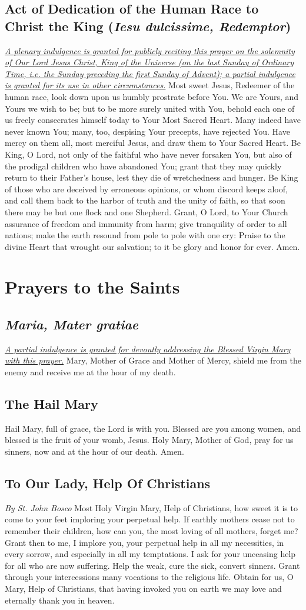 \documentclass[12pt]{article}
\newcommand{\prayersection}[1]{\section{#1}}
\newcommand{\prayertitle}[1]{\subsection{#1}}
\newcommand{\indulgencedprayertitle}[1]{\prayertitle{#1 \protect\kreuz}}
\newcommand{\emphasis}[1]{\emph{#1}}
\newcommand{\emphasis}[1]{\textsl{#1}}
\newcommand{\foreign}[1]{\emphasis{#1}}
\newcommand{\note}[1]{{\small{\emphasis{#1}}}\newline}
\newcommand{\linkednote}[2]{\hyperlink{#1}{\note{#2}}}
\begin{document}
\indulgencedprayertitle{Act of Dedication of the Human Race to Christ the King (\foreign{Iesu dulcissime, Redemptor})}
\linkednote{grant2}{A plenary indulgence is granted for publicly reciting this prayer on the solemnity of Our Lord Jesus Christ, King of the Universe (on the last Sunday of Ordinary Time, i.e. the Sunday preceding the first Sunday of Advent);
a partial indulgence is granted for its use in other circumstances.}
Most sweet Jesus, Redeemer of the human race, look down upon us humbly prostrate before You.
We are Yours, and Yours we wish to be;
but to be more surely united with You, behold each one of us freely consecrates himself today to Your Most Sacred Heart.
Many indeed have never known You;
many, too, despising Your precepts, have rejected You.
Have mercy on them all, most merciful Jesus, and draw them to Your Sacred Heart.
Be King, O Lord, not only of the faithful who have never forsaken You, but also of the prodigal children who have abandoned You;
grant that they may quickly return to their Father's house, lest they die of wretchedness and hunger.
Be King of those who are deceived by erroneous opinions, or whom discord keeps aloof, and call them back to the harbor of truth and the unity of faith, so that soon there may be but one flock and one Shepherd.
Grant, O Lord, to Your Church assurance of freedom and immunity from harm;
give tranquility of order to all nations;
make the earth resound from pole to pole with one cry:
Praise to the divine Heart that wrought our salvation;
to it be glory and honor for ever.
Amen.

\newpage

\prayersection{Prayers to the Saints}
\indulgencedprayertitle{\foreign{Maria, Mater gratiae}}
\linkednote{grant17}{A partial indulgence is granted for devoutly addressing the Blessed Virgin Mary with this prayer.}
Mary, Mother of Grace and Mother of Mercy, shield me from the enemy and receive me at the hour of my death.

\prayertitle{The Hail Mary}
Hail Mary, full of grace, the Lord is with you.
Blessed are you among women, and blessed is the fruit of your womb, Jesus.
Holy Mary, Mother of God, pray for us sinners, now and at the hour of our death.
Amen.

\prayertitle{To Our Lady, Help Of Christians}
\label{prayer:Our_Lady_help_of_Christians}
\note{By St. John Bosco}
Most Holy Virgin Mary, Help of Christians, how sweet it is to come to your feet
imploring your perpetual help.
If earthly mothers cease not to remember their children, how can you, the most loving of all mothers, forget me?
Grant then to me, I implore you, your perpetual help in all my necessities, in every sorrow, and especially in all my temptations.
I ask for your unceasing help for all who are now suffering.
Help the weak, cure the sick, convert sinners.
Grant through your intercessions many vocations to the religious life.
Obtain for us, O Mary, Help of Christians, that having invoked you on earth we may love and eternally thank you in heaven.
\end{document}
